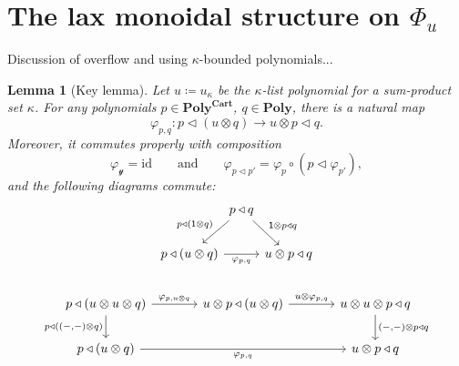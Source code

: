 \documentclass[11pt, one side, article]{memoir}
\theoremstyle{definition}
\theoremstyle{plain}
\newtheorem{lemma}[definitionx]{Lemma}
\newcommand{\Cat}[1]{\mathbf{#1}}%
\newcommand{\id}{\mathrm{id}}
\newcommand{\yon}{\mathcal{y}}
\newcommand{\poly}{\Cat{Poly}}
\newcommand{\polycart}{\poly^{\Cat{Cart}}}
\newcommand{\0}{\textsf{0}}
\newcommand{\1}{\tn{\textsf{1}}}
\newcommand{\tri}{\mathbin{\triangleleft}}
\newcommand{\qqand}{\qquad\text{and}\qquad}
\begin{document}
\section{The lax monoidal structure on $\Phi_u$}

Discussion of overflow and using $\kappa$-bounded polynomials...

\begin{lemma}[Key lemma]\label{lemma.key}
Let $u\coloneqq u_\kappa$ be the $\kappa$-list polynomial for a sum-product set $\kappa$. For any polynomials $p\in\polycart$, $q\in\poly$, there is a natural map 
\[\varphi_{p,q}\colon p\tri(u\otimes q)\to u\otimes p\tri q.\] 
Moreover, it commutes properly with composition
\[
	\varphi_{\yon}=\id
	\qqand
	\varphi_{p\tri p'}=\varphi_{p}\circ (p\tri\varphi_{p'}),
\]
and the following diagrams commute:
\begin{gather*}
\begin{tikzcd}[column sep=0, ampersand replacement=\&]
	\&p\tri q\ar[dl, "p\tri(\1\otimes q)"']\ar[dr,"\1\otimes p\tri q"]\\
	p\tri(u\otimes q)\ar[rr, "\varphi_{p,q}"']\&\&u\otimes p\tri q
\end{tikzcd}
\\[15pt]
\begin{tikzcd}[, ampersand replacement=\&, column sep=large]
	p\tri(u\otimes u\otimes q)\ar[r, "\varphi_{p,u\otimes q}"]\ar[d, "p\tri{((-,-)\otimes q)}"']\&
	u\otimes p\tri(u\otimes q)\ar[r, "u\otimes\varphi_{p,q}"]\&
	u\otimes u\otimes p\tri q\ar[d, "{(-,-)}\otimes p\tri q"]\\
	p\tri (u\otimes q)\ar[rr, "\varphi_{p,q}"']\&\&
	u\otimes p\tri q
\end{tikzcd}
\end{gather*}
\end{lemma}
\end{document}
